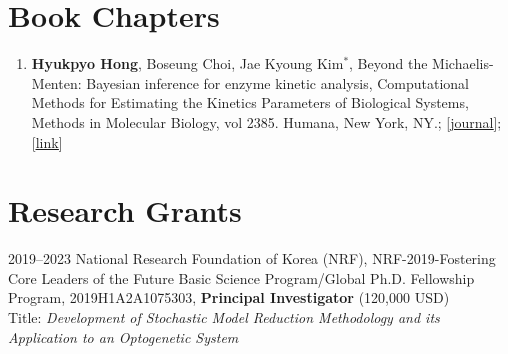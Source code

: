 \documentclass[margin,line]{res}
\newcommand{\vspacesection}{\vspace*{-1.5mm}}
\begin{document}
\begin{resume}
\begin{enumerate}[leftmargin=*]
\end{enumerate}
\vspacesection
\section{\sc Book Chapters}
\begin{enumerate}[leftmargin=*]
    \item \textbf{Hyukpyo Hong}, Boseung Choi, Jae Kyoung Kim${}^*$, Beyond the Michaelis-Menten: Bayesian inference for enzyme kinetic analysis, Computational Methods for Estimating the Kinetics Parameters of Biological Systems, Methods in Molecular Biology, vol 2385. Humana, New York, NY.; [\href{https://doi.org/10.1007/978-1-0716-1767-0_3}{\ul{journal}}]; [\href{https://www.springer.com/gp/book/9781071617663}{\ul{link}}]
\end{enumerate}
\section{\sc Research Grants}
2019–2023 National Research Foundation of Korea (NRF), NRF-2019-Fostering Core Leaders of the Future Basic Science Program/Global Ph.D. Fellowship Program, 2019H1A2A1075303, \textbf{Principal Investigator} (120,000 USD)\\
Title: \textit{Development of Stochastic Model Reduction Methodology and its Application to an Optogenetic System}

\vspacesection

\end{resume}
\end{document}
